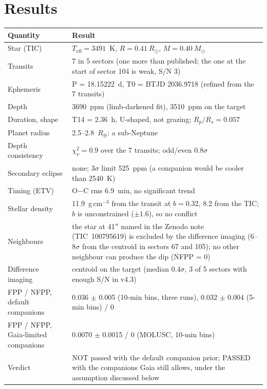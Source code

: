 \section*{Results}

\begin{longtable}{@{}p{}p{}@{}}
\toprule
\textbf{Quantity} & \textbf{Result}\\
\midrule\endhead
Star (TIC) & $T_\mathrm{eff} = 3491$~K, $R = 0.41~R_\odot$, $M = 0.40~M_\odot$\\
Transits & 7 in 5 sectors (one more than published; the one at the start
of sector 104 is weak, S/N 3)\\
Ephemeris & P = 18.15222~d, T0 = BTJD 2036.9718 (refined from the 7 transits)\\
Depth & 3690~ppm (limb-darkened fit), 3510~ppm on the target\\
Duration, shape & T14 = 2.36~h, U-shaped, not grazing; $R_p/R_\star = 0.057$\\
Planet radius & 2.5--2.8~$R_\oplus$: a sub-Neptune\\
Depth consistency & $\chi^2_\nu = 0.9$ over the 7 transits; odd/even 0.8$\sigma$\\
Secondary eclipse & none; 3$\sigma$ limit 525~ppm (a companion would be cooler than 2540~K)\\
Timing (ETV) & O$-$C rms 6.9~min, no significant trend\\
Stellar density & 11.9~g\,cm$^{-3}$ from the transit at $b = 0.32$, 8.2 from the TIC; $b$ is unconstrained ($\pm1.6$), so no conflict\\
Neighbours & the star at 41$''$ named in the Zenodo note (TIC~100795619)
is excluded by the difference imaging (6--8$\sigma$ from the centroid in
sectors 67 and 105); no other neighbour can produce the dip (NFPP = 0)\\
Difference imaging & centroid on the target (median 0.4$\sigma$, 3 of 5 sectors with enough S/N in v4.3)\\
FPP / NFPP, default companions & 0.036 $\pm$ 0.005 (10-min bins, three runs), 0.032 $\pm$ 0.004 (5-min bins) / 0\\
FPP / NFPP, Gaia-limited companions & 0.0070 $\pm$ 0.0015 / 0 (MOLUSC, 10-min bins)\\
Verdict & NOT passed with the default companion prior; PASSED with the companions Gaia still allows, under the assumption discussed below\\
\bottomrule
\end{longtable}

